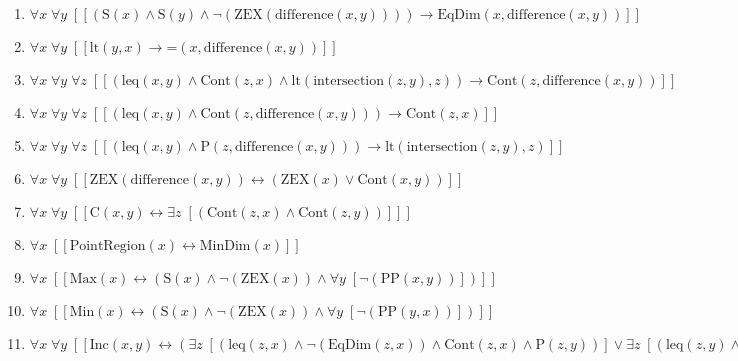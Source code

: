 \documentclass{article}
\begin{document}
\begin{enumerate}
\item $\forall x\; \forall y\;  \left[ \left[ \left(\textrm{S}(x) \land \textrm{S}(y) \land \neg \left(\textrm{ZEX}(\textrm{difference}(x,y))\right)\right) \rightarrow \textrm{EqDim}(x,\textrm{difference}(x,y)) \right] \right]$
\item $\forall x\; \forall y\;  \left[ \left[ \textrm{lt}(y,x) \rightarrow \textrm{=}(x,\textrm{difference}(x,y)) \right] \right]$
\item $\forall x\; \forall y\; \forall z\;  \left[ \left[ \left(\textrm{leq}(x,y) \land \textrm{Cont}(z,x) \land \textrm{lt}(\textrm{intersection}(z,y),z)\right) \rightarrow \textrm{Cont}(z,\textrm{difference}(x,y)) \right] \right]$
\item $\forall x\; \forall y\; \forall z\;  \left[ \left[ \left(\textrm{leq}(x,y) \land \textrm{Cont}(z,\textrm{difference}(x,y))\right) \rightarrow \textrm{Cont}(z,x) \right] \right]$
\item $\forall x\; \forall y\; \forall z\;  \left[ \left[ \left(\textrm{leq}(x,y) \land \textrm{P}(z,\textrm{difference}(x,y))\right) \rightarrow \textrm{lt}(\textrm{intersection}(z,y),z) \right] \right]$
\item $\forall x\; \forall y\;  \left[ \left[ \textrm{ZEX}(\textrm{difference}(x,y)) \leftrightarrow \left(\textrm{ZEX}(x) \lor \textrm{Cont}(x,y)\right) \right] \right]$
\item $\forall x\; \forall y\;  \left[ \left[ \textrm{C}(x,y) \leftrightarrow \exists z\;  \left[ \left(\textrm{Cont}(z,x) \land \textrm{Cont}(z,y)\right) \right] \right] \right]$
\item $\forall x\;  \left[ \left[ \textrm{PointRegion}(x) \leftrightarrow \textrm{MinDim}(x) \right] \right]$
\item $\forall x\;  \left[ \left[ \textrm{Max}(x) \leftrightarrow \left(\textrm{S}(x) \land \neg \left(\textrm{ZEX}(x)\right) \land \forall y\;  \left[ \neg \left(\textrm{PP}(x,y)\right) \right]\right) \right] \right]$
\item $\forall x\;  \left[ \left[ \textrm{Min}(x) \leftrightarrow \left(\textrm{S}(x) \land \neg \left(\textrm{ZEX}(x)\right) \land \forall y\;  \left[ \neg \left(\textrm{PP}(y,x)\right) \right]\right) \right] \right]$
\item $\forall x\; \forall y\;  \left[ \left[ \textrm{Inc}(x,y) \leftrightarrow \left(\exists z\;  \left[ \left(\textrm{leq}(z,x) \land \neg \left(\textrm{EqDim}(z,x)\right) \land \textrm{Cont}(z,x) \land \textrm{P}(z,y)\right) \right] \lor \exists z\;  \left[ \left(\textrm{leq}(z,y) \land \neg \left(\textrm{EqDim}(z,y)\right) \land \textrm{Cont}(z,y) \land \textrm{P}(z,x)\right) \right]\right) \right] \right]$

\end{enumerate}
\end{document}

